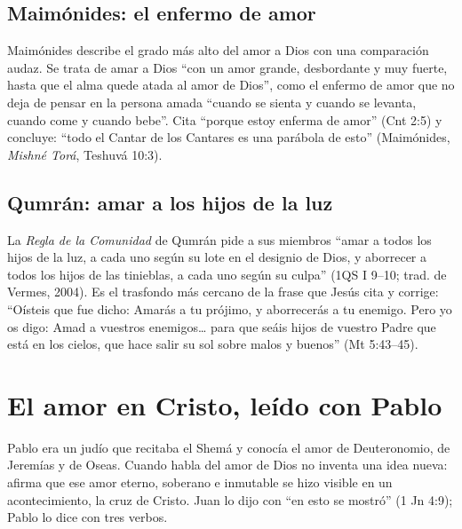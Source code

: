
\subsection{Maimónides: el enfermo de amor}
Maimónides describe el grado más alto del amor a Dios con una comparación audaz. Se trata de amar a Dios ``con un amor grande, desbordante y muy fuerte, hasta que el alma quede atada al amor de Dios'', como el enfermo de amor que no deja de pensar en la persona amada ``cuando se sienta y cuando se levanta, cuando come y cuando bebe''. Cita ``porque estoy enferma de amor'' (Cnt 2:5) y concluye: ``todo el Cantar de los Cantares es una parábola de esto'' (Maimónides, \emph{Mishné Torá}, Teshuvá 10:3).

\subsection{Qumrán: amar a los hijos de la luz}
La \emph{Regla de la Comunidad} de Qumrán pide a sus miembros ``amar a todos los hijos de la luz, a cada uno según su lote en el designio de Dios, y aborrecer a todos los hijos de las tinieblas, a cada uno según su culpa'' (1QS I 9--10; trad. de Vermes, 2004). Es el trasfondo más cercano de la frase que Jesús cita y corrige: ``Oísteis que fue dicho: Amarás a tu prójimo, y aborrecerás a tu enemigo. Pero yo os digo: Amad a vuestros enemigos\ldots{} para que seáis hijos de vuestro Padre que está en los cielos, que hace salir su sol sobre malos y buenos'' (Mt 5:43--45).


\section{El amor en Cristo, leído con Pablo}\label{sec:cristo-amor}

Pablo era un judío que recitaba el Shemá y conocía el amor de Deuteronomio, de Jeremías y de Oseas. Cuando habla del amor de Dios no inventa una idea nueva: afirma que ese amor eterno, soberano e inmutable se hizo visible en un acontecimiento, la cruz de Cristo. Juan lo dijo con ``en esto se mostró'' (1 Jn 4:9); Pablo lo dice con tres verbos.


